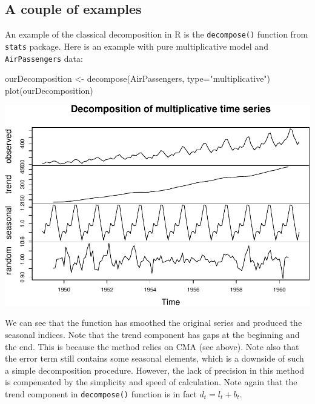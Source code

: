 \documentclass[
]{book}
\newenvironment{Shaded}{\begin{snugshade}}{\end{snugshade}}
\newcommand{\AttributeTok}[1]{\textcolor[rgb]{0.77,0.63,0.00}{#1}}
\newcommand{\FunctionTok}[1]{\textcolor[rgb]{0.00,0.00,0.00}{#1}}
\newcommand{\NormalTok}[1]{#1}
\newcommand{\OtherTok}[1]{\textcolor[rgb]{0.56,0.35,0.01}{#1}}
\newcommand{\StringTok}[1]{\textcolor[rgb]{0.31,0.60,0.02}{#1}}
\theoremstyle{definition}
\theoremstyle{definition}
\theoremstyle{definition}
\theoremstyle{definition}
\theoremstyle{remark}
\begin{document}
\hypertarget{a-couple-of-examples}{%
\subsection{A couple of examples}\label{a-couple-of-examples}}

An example of the classical decomposition in R is the \texttt{decompose()} function from \texttt{stats} package. Here is an example with pure multiplicative model and \texttt{AirPassengers} data:

\begin{Shaded}
\begin{Highlighting}[]
\NormalTok{ourDecomposition }\OtherTok{\textless{}{-}} \FunctionTok{decompose}\NormalTok{(AirPassengers,}
                              \AttributeTok{type=}\StringTok{"multiplicative"}\NormalTok{)}
\FunctionTok{plot}\NormalTok{(ourDecomposition)}
\end{Highlighting}
\end{Shaded}

\includegraphics{Svetunkov--2022----ADAM_files/figure-latex/decomposeAirPassengers-1.pdf}

We can see that the function has smoothed the original series and produced the seasonal indices. Note that the trend component has gaps at the beginning and the end. This is because the method relies on CMA (see above). Note also that the error term still contains some seasonal elements, which is a downside of such a simple decomposition procedure. However, the lack of precision in this method is compensated by the simplicity and speed of calculation. Note again that the trend component in \texttt{decompose()} function is in fact \(d_t = l_{t}+b_{t}\).
\end{document}
